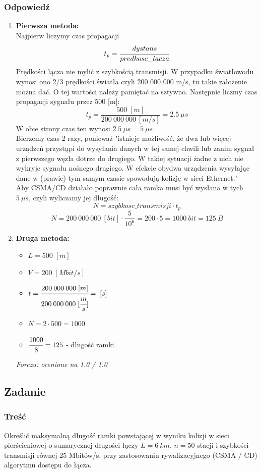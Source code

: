 		\subsubsection{Odpowiedź}
		\begin{enumerate}
			\item \textbf{Pierwsza metoda:}\\
			Najpierw liczymy czas propagacji $$ t_p = \cfrac{dystans}{predkosc\_lacza} $$
			Prędkości łącza nie mylić z szybkością transmisji. W przypadku światłowodu wynosi ono 2/3 prędkości światła czyli 200 000 000 m/s, tu takie założenie można dać. O tej wartości należy pamiętać na sztywno. Następnie liczmy czas propagacji sygnału przez 500 [m]:
			$$ t_p=\frac{500\;[m]}{200\:000\:000\:[m/s]}=2.5\:\mu s $$
			W obie strony czas ten wynosi $ 2.5\:\mu s = 5\:\mu s$.\\
			Bierzemy czas 2 razy, ponieważ "istnieje możliwość, że dwa lub więcej urządzeń przystąpi do wysyłania danych w tej samej chwili lub zanim sygnał z pierwszego węzła dotrze do drugiego. W takiej sytuacji żadne z nich nie wykryje sygnału nośnego drugiego. W efekcie obydwa urządzenia wysyłając dane w (prawie) tym samym czasie spowodują kolizję w sieci Ethernet."\\
			Aby CSMA/CD działało poprawnie cała ramka musi być wysłana w tych $5\:\mu s$, czyli wyliczamy jej długość:
			$$ N=szybkosc\_transmisji\cdot t_p $$
			$$ N=200\:000\:000\:[bit]\cdot \frac{5}{10^6} =200\cdot5=1000\:bit=125\:B $$
			\item \textbf{Druga metoda:}\\
			\begin{itemize}
				\item $ L=500\;[m] $
				\item $ V=200\;[Mbit/s] $
				\item $ t=\cfrac{200\:000\:000\;[{m}]}{200\:000\:000\;[\cfrac{m}{s}]}=\;[s] $
				\item $ N=2\cdot500=1000 $
				\item $ \cfrac{1000}{8}=125 $ - długość ramki
			\end{itemize}
			{\small \emph{Forczu: ocenione na 1.0 / 1.0}}
		\end{enumerate}
			
	\subsection{Zadanie}
		\subsubsection{Treść}
			Określić maksymalną długość ramki powstającej w wyniku kolizji w sieci pierścieniowej o sumarycznej długości łączy $ L=6\:km $, $ n=50 $ stacji i szybkości transmisji równej 25 Mbitów/s, przy zastosowaniu rywalizacyjnego (CSMA / CD) algorytmu dostępu do łącza.
